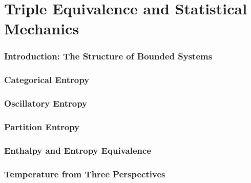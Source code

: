 \documentclass[twocolumn,10pt]{article}
\theoremstyle{plain}
\theoremstyle{definition}
\theoremstyle{remark}
\begin{document}
\tableofcontents


\part{Triple Equivalence and Statistical Mechanics}
\label{part:thermodynamics}

\section{Introduction: The Structure of Bounded Systems}
\label{sec:introduction_bounded}



\section{Categorical Entropy}
\label{sec:categorical_entropy}



\section{Oscillatory Entropy}
\label{sec:oscillatory_entropy}



\section{Partition Entropy}
\label{sec:partition_entropy}



\section{Enthalpy and Entropy Equivalence}
\label{sec:enthalpy}



\section{Temperature from Three Perspectives}
\label{sec:temperature}


\end{document}
